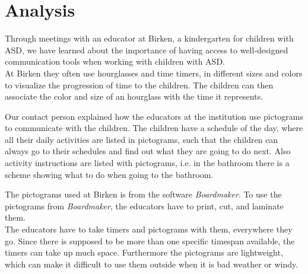 \chapter{Analysis}
\label{cha:analysis}
Through meetings with an educator at Birken, a kindergarten for children with ASD, we have learned about the importance of having access to well-designed communication tools when working with children with ASD.\\

At Birken they often use hourglasses and time timers, in different sizes and colors to visualize the progression of time to the children. The children can then associate the color and size of an hourglass with the time it represents.

Our contact person explained how the educators at the institution use pictograms to communicate with the children. The children have a schedule of the day, where all their daily activities are listed in pictograms, such that the children can always go to their schedules and find out what they are going to do next. Also activity instructions are listed with pictograms, i.e. in the bathroom there is a scheme showing what to do when going to the bathroom.

The pictograms used at Birken is from the software \textit{Boardmaker}\cite{web:boardmaker}. To use the pictograms from \textit{Boardmaker}, the educators have to print, cut, and laminate them.\\

The educators have to take timers and pictograms with them, everywhere they go. Since there is supposed to be more than one specific timespan available, the timers can take up much space. Furthermore the pictograms are lightweight, which can make it difficult to use them outside when it is bad weather or windy.